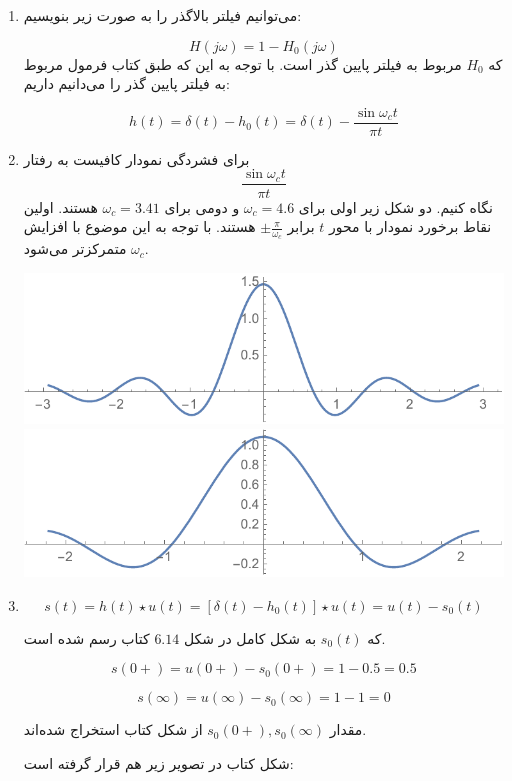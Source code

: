 \documentclass[12pt]{article}
\begin{document}
\begin{enumerate}
	\item 
	می‌توانیم فیلتر بالاگذر را به صورت زیر بنویسیم:
	
	$$H(j\omega) = 1 - H_0 (j \omega)$$
	که
	$H_0$
	مربوط به فیلتر پایین گذر است. با توجه به این که طبق کتاب فرمول مربوط به فیلتر پایین گذر را می‌دانیم داریم:
	
	$$h(t) = \delta(t) - h_0 (t) = \delta(t) - \frac{\sin \omega_c t}{\pi t}$$
	
	\item
	برای فشردگی نمودار کافیست به رفتار
	$$ \frac{\sin \omega_c t}{\pi t}$$
	نگاه کنیم. دو شکل زیر اولی برای $\omega_c = 4.6$ و دومی برای
	$\omega_c = 3.41$
	هستند. اولین نقاط برخورد نمودار با محور $t$ برابر
	$\pm \frac{\pi}{\omega_c} $
	هستند. با توجه به این موضوع با افزایش
	$\omega_c$
	متمرکزتر می‌شود.
	
	\includegraphics[width = 1.0\textwidth]{images/2.pdf}
	\includegraphics[width = 1.0\textwidth]{images/3.pdf}
	
	\item
	
	$$s(t) = h(t) \star u(t) = [\delta(t) - h_0 (t)] \star u(t) = u(t) - s_0(t)$$
	
	که 
	$s_0(t)$
	به شکل کامل در شکل $6.14$ کتاب رسم شده است.
	
	$$s(0+) = u(0+) -s_0(0+) = 1 - 0.5 = 0.5$$
	
	$$s(\infty) = u(\infty) - s_0(\infty) = 1-1 =0$$
	
	مقدار
	$s_0(0+),s_0(\infty)$
	از شکل کتاب استخراج شده‌اند.
	
	شکل کتاب در تصویر زیر هم قرار گرفته است:
	

\end{enumerate}
\end{document}
